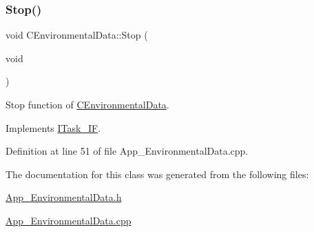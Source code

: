 \subsubsection{\texorpdfstring{Stop()}{Stop()}}
{\footnotesize\ttfamily void C\+Environmental\+Data\+::\+Stop (\begin{DoxyParamCaption}\item[{void}]{ }\end{DoxyParamCaption})\hspace{0.3cm}{\ttfamily [virtual]}}



Stop function of \mbox{\hyperlink{class_c_environmental_data}{C\+Environmental\+Data}}. 



Implements \mbox{\hyperlink{class_i_task___i_f_af5f8fba86704c7e36d0e4681d58300c6}{I\+Task\+\_\+\+IF}}.



Definition at line 51 of file App\+\_\+\+Environmental\+Data.\+cpp.



The documentation for this class was generated from the following files\+:\begin{DoxyCompactItemize}
\item 
\mbox{\hyperlink{_app___environmental_data_8h}{App\+\_\+\+Environmental\+Data.\+h}}\item 
\mbox{\hyperlink{_app___environmental_data_8cpp}{App\+\_\+\+Environmental\+Data.\+cpp}}\end{DoxyCompactItemize}
